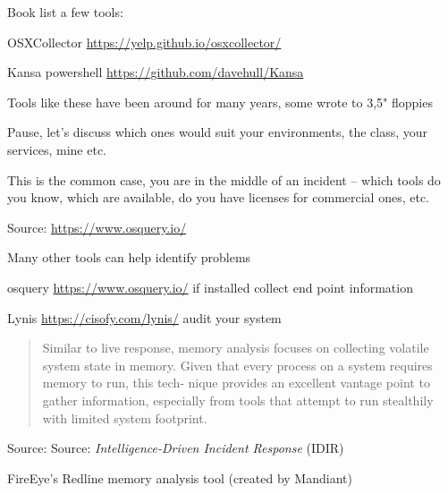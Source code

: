 \documentclass[Screen16to9,17pt]{foils}
\begin{document}


Book list a few tools:
\begin{list2}
\item OSXCollector \url{https://yelp.github.io/osxcollector/}
\item Kansa powershell \url{https://github.com/davehull/Kansa}
\item Tools like these have been around for many years, some wrote to 3,5" floppies
\end{list2}

Pause, let's discuss which ones would suit your environments, the class, your services, mine etc.

This is the common case, you are in the middle of an incident -- which tools do you know, which are available, do you have licenses for commercial ones, etc.


Source: \url{https://www.osquery.io/}

Many other tools can help identify problems
\begin{list2}
\item osquery \url{https://www.osquery.io/} if installed collect end point information
\item Lynis \url{https://cisofy.com/lynis/} audit your system
\end{list2}




\begin{quote}
Similar to live response, memory analysis focuses on collecting volatile system state
in memory. Given that every process on a system requires memory to run, this tech‐
nique provides an excellent vantage point to gather information, especially from tools
that attempt to run stealthily with limited system footprint.
\end{quote}
Source: Source: \emph{Intelligence-Driven Incident Response} (IDIR)

\begin{list2}
\item FireEye’s Redline memory analysis tool (created by Mandiant)
\end{list2}

\end{document}
